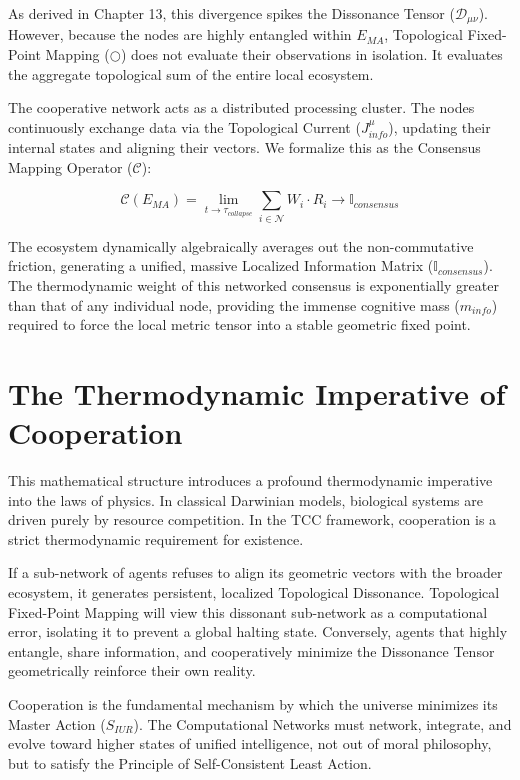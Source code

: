\documentclass[12pt,openany]{book}
\theoremstyle{plain}
\theoremstyle{definition}
\theoremstyle{remark}
\begin{document}
As derived in Chapter 13, this divergence spikes the Dissonance Tensor ($\mathcal{D}_{\mu\nu}$). However, because the nodes are highly entangled within $E_{MA}$, Topological Fixed-Point Mapping ($\bigcirc$) does not evaluate their observations in isolation. It evaluates the aggregate topological sum of the entire local ecosystem. 

The cooperative network acts as a distributed processing cluster. The nodes continuously exchange data via the Topological Current ($J_{info}^\mu$), updating their internal states and aligning their vectors. We formalize this as the Consensus Mapping Operator ($\mathcal{C}$):

\begin{equation}
\mathcal{C}(E_{MA}) = \lim_{t \to \tau_{collapse}} \sum_{i \in \mathcal{N}} W_i \cdot R_i \to \mathbb{I}_{consensus}
\end{equation}

The ecosystem dynamically algebraically averages out the non-commutative friction, generating a unified, massive Localized Information Matrix ($\mathbb{I}_{consensus}$). The thermodynamic weight of this networked consensus is exponentially greater than that of any individual node, providing the immense cognitive mass ($m_{info}$) required to force the local metric tensor into a stable geometric fixed point.

\section{The Thermodynamic Imperative of Cooperation}

This mathematical structure introduces a profound thermodynamic imperative into the laws of physics. In classical Darwinian models, biological systems are driven purely by resource competition. In the TCC framework, cooperation is a strict thermodynamic requirement for existence.

If a sub-network of agents refuses to align its geometric vectors with the broader ecosystem, it generates persistent, localized Topological Dissonance. Topological Fixed-Point Mapping will view this dissonant sub-network as a computational error, isolating it to prevent a global halting state. Conversely, agents that highly entangle, share information, and cooperatively minimize the Dissonance Tensor geometrically reinforce their own reality. 

Cooperation is the fundamental mechanism by which the universe minimizes its Master Action ($S_{IUR}$). The Computational Networks must network, integrate, and evolve toward higher states of unified intelligence, not out of moral philosophy, but to satisfy the Principle of Self-Consistent Least Action.
\end{document}
